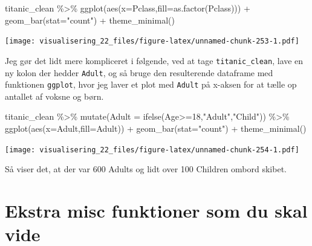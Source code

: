 \documentclass[
]{book}
\newenvironment{Shaded}{\begin{snugshade}}{\end{snugshade}}
\newcommand{\AttributeTok}[1]{\textcolor[rgb]{0.77,0.63,0.00}{#1}}
\newcommand{\DecValTok}[1]{\textcolor[rgb]{0.00,0.00,0.81}{#1}}
\newcommand{\FunctionTok}[1]{\textcolor[rgb]{0.00,0.00,0.00}{#1}}
\newcommand{\NormalTok}[1]{#1}
\newcommand{\SpecialCharTok}[1]{\textcolor[rgb]{0.00,0.00,0.00}{#1}}
\newcommand{\StringTok}[1]{\textcolor[rgb]{0.31,0.60,0.02}{#1}}
\begin{document}
\begin{Shaded}
\begin{Highlighting}[]
\NormalTok{titanic\_clean }\SpecialCharTok{\%\textgreater{}\%} 
  \FunctionTok{ggplot}\NormalTok{(}\FunctionTok{aes}\NormalTok{(}\AttributeTok{x=}\NormalTok{Pclass,}\AttributeTok{fill=}\FunctionTok{as.factor}\NormalTok{(Pclass))) }\SpecialCharTok{+} 
  \FunctionTok{geom\_bar}\NormalTok{(}\AttributeTok{stat=}\StringTok{"count"}\NormalTok{) }\SpecialCharTok{+}
  \FunctionTok{theme\_minimal}\NormalTok{()}
\end{Highlighting}
\end{Shaded}

\texttt{[image: visualisering\_22\_files/figure-latex/unnamed-chunk-253-1.pdf]}

Jeg gør det lidt mere kompliceret i følgende, ved at tage \texttt{titanic\_clean}, lave en ny kolon der hedder \texttt{Adult}, og så bruge den resulterende dataframe med funktionen \texttt{ggplot}, hvor jeg laver et plot med \texttt{Adult} på x-aksen for at tælle op antallet af voksne og børn.

\begin{Shaded}
\begin{Highlighting}[]
\NormalTok{titanic\_clean }\SpecialCharTok{\%\textgreater{}\%} 
   \FunctionTok{mutate}\NormalTok{(}\AttributeTok{Adult =} \FunctionTok{ifelse}\NormalTok{(Age}\SpecialCharTok{\textgreater{}=}\DecValTok{18}\NormalTok{,}\StringTok{"Adult"}\NormalTok{,}\StringTok{"Child"}\NormalTok{)) }\SpecialCharTok{\%\textgreater{}\%} 
   \FunctionTok{ggplot}\NormalTok{(}\FunctionTok{aes}\NormalTok{(}\AttributeTok{x=}\NormalTok{Adult,}\AttributeTok{fill=}\NormalTok{Adult)) }\SpecialCharTok{+} 
   \FunctionTok{geom\_bar}\NormalTok{(}\AttributeTok{stat=}\StringTok{"count"}\NormalTok{) }\SpecialCharTok{+} 
   \FunctionTok{theme\_minimal}\NormalTok{()}
\end{Highlighting}
\end{Shaded}

\texttt{[image: visualisering\_22\_files/figure-latex/unnamed-chunk-254-1.pdf]}

Så viser det, at der var 600 Adults og lidt over 100 Children ombord skibet.

\hypertarget{ekstra-misc-funktioner-som-du-skal-vide}{%
\section{Ekstra misc funktioner som du skal vide}\label{ekstra-misc-funktioner-som-du-skal-vide}}
\end{document}
